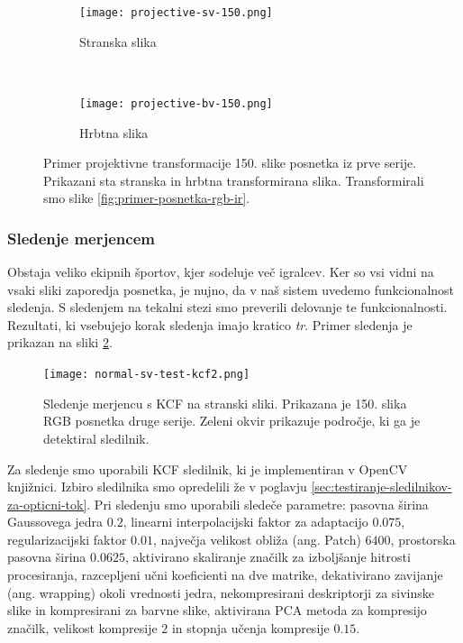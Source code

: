\begin{figure}[!htb]
	\centering
	\begin{subfigure}[t]{0.45\columnwidth}
		\centering
		\texttt{[image: projective-sv-150.png]}
		\caption{Stranska slika}
	\end{subfigure}
	~
	\begin{subfigure}[t]{0.45\columnwidth}
		\centering
		\texttt{[image: projective-bv-150.png]}
		\caption{Hrbtna slika}
	\end{subfigure}
	\caption[Primer projektivne transformacije 150. slike posnetka iz prve serije]{Primer projektivne transformacije 150. slike posnetka iz prve serije. Prikazani sta stranska in hrbtna transformirana slika. Transformirali smo slike \ref{fig:primer-posnetka-rgb-ir}.}
	\label{fig:projective}
\end{figure}


\subsubsection{Sledenje merjencem}\label{sec:tracking}
Obstaja veliko ekipnih športov, kjer sodeluje več igralcev. Ker so vsi vidni na vsaki sliki zaporedja posnetka, je nujno, da v naš sistem uvedemo funkcionalnost sledenja. S sledenjem na tekalni stezi smo preverili delovanje te funkcionalnosti. Rezultati, ki vsebujejo korak sledenja imajo kratico \textit{tr}. Primer sledenja je prikazan na sliki \ref{fig:sledenje}.

\begin{figure}[!htb]
	\centering
	\texttt{[image: normal-sv-test-kcf2.png]}
	\caption[Sledenje merjencu s KCF na stranski sliki]{Sledenje merjencu s KCF na stranski sliki. Prikazana je 150. slika RGB posnetka druge serije. Zeleni okvir prikazuje področje, ki ga je detektiral sledilnik.}
	\label{fig:sledenje}
\end{figure} 

Za sledenje smo uporabili KCF sledilnik, ki je implementiran v OpenCV knjižnici. Izbiro sledilnika smo opredelili že v poglavju \ref{sec:testiranje-sledilnikov-za-opticni-tok}. Pri sledenju smo uporabili sledeče parametre: pasovna širina Gaussovega jedra $0.2$, linearni interpolacijski faktor za adaptacijo $0.075$, regularizacijski faktor $0.01$, največja velikost obliža (ang. Patch) $6400$, prostorska pasovna širina $0.0625$, aktivirano skaliranje značilk za izboljšanje hitrosti procesiranja, razcepljeni učni koeficienti na dve matrike, dekativirano zavijanje (ang. wrapping) okoli vrednosti jedra, nekompresirani deskriptorji za sivinske slike in kompresirani za barvne slike, aktivirana PCA metoda za kompresijo značilk, velikost kompresije $2$ in  stopnja učenja kompresije $0.15$.

